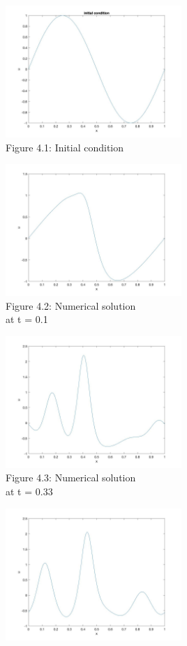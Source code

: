 \documentclass[a4paper,11pt]{article}
\begin{document}
\begin{figure}[H]
\begin{subfigure}{0.5\textwidth}
\includegraphics[width = \linewidth, height = 5cm]{Q4(6).jpg}
\caption{Figure 4.1: Initial condition}
\label{Q4(1)}
\end{subfigure}
\begin{subfigure}{0.5\textwidth}
\includegraphics[width = \linewidth, height = 5cm]{Q4(5).jpg}
\caption{Figure 4.2: Numerical solution \\ at  t = 0.1}
\label{Q4(2)}
\end{subfigure}
\begin{subfigure}{0.5\textwidth}
\includegraphics[width = \linewidth, height = 5cm]{Q4(4).jpg}
\caption{Figure 4.3: Numerical solution \\at t = 0.33}
\label{Q4(3)}
\end{subfigure}
\begin{subfigure}{0.5\textwidth}
\includegraphics[width = \linewidth, height = 5cm]{Q4(3).jpg}

\end{subfigure}
\end{figure}
\end{document}
